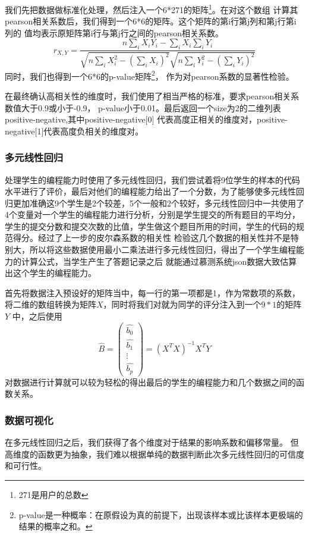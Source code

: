\documentclass[UTF8]{ctexart}
\begin{document}
我们先把数据做标准化处理，然后注入一个6*271的矩阵\footnote{271是用户的总数}。在对这个数组
计算其pearson相关系数后，我们得到一个6*6的矩阵。这个矩阵的第i行第j列和第j行第i列的
值均表示原矩阵第i行与第j行之间的pearson相关系数。$$ r_{X,Y}=\dfrac{n\sum_{i} X_iY_i-\sum_{i} X_i \sum_{i} Y_i}{\sqrt{n\sum_{i} X_i^2-(\sum_{i} X_i)^2}\sqrt{n\sum_{i} Y_i^2-(\sum_{i} Y_i)^2}} $$
同时，我们也得到一个6*6的p-value矩阵\footnote{p-value是一种概率：在原假设为真的前提下，出现该样本或比该样本更极端的结果的概率之和。}，
作为对pearson系数的显著性检验。

在最终确认高相关性的维度时，我们使用了相当严格的标准，要求pearson相关系数值大于0.9或小于-0.9，
p-value小于0.01。最后返回一个size为2的二维列表positive-negative,其中positive-negative[0]
代表高度正相关的维度对，positive-negative[1]代表高度负相关的维度对。
\subsubsection{多元线性回归}
处理学生的编程能力时使用了多元线性回归，我们尝试着将9位学生的样本的代码水平进行了评价，最后对他们的编程能力给出了一个分数，为了能够使多元线性回
归更加准确这9个学生是2个较差，5个一般和2个较好，多元线性回归中一共使用了4个变量对一个学生的编程能力进行分析，分别是学生提交的所有题目的平均分，
学生的提交分数和提交次数的比值，学生做这个题目所用的时间，学生的代码的规范得分。经过了上一步的皮尔森系数的相关性
检验这几个数据的相关性并不是特别大，所以将这些数据使用最小二乘法进行多元线性回归，得出了一个学生编程能力的计算公式，当学生产生了答题记录之后
就能通过慕测系统json数据大致估算出这个学生的编程能力。

首先将数据注入预设好的矩阵当中，每一行的第一项都是1，作为常数项的系数，将二维的数组转换为矩阵$X$，同时将我们对就为同学的评分注入到一个$9*1$的矩阵$Y$
中，之后使用\boldmath$$\hat{B}=\begin{pmatrix}
    \hat{b_0}\\\hat{b_1}\\\vdots\\\hat{b_p}
\end{pmatrix}=(X^TX)^{-1}X^TY$$\unboldmath
对数据进行计算就可以较为轻松的得出最后的学生的编程能力和几个数据之间的函数关系。
\subsubsection{数据可视化}
在多元线性回归之后，我们获得了各个维度对于结果的影响系数和偏移常量。
但高维度的函数更为抽象，我们难以根据单纯的数据判断此次多元线性回归的可信度和可行性。
\end{document}
